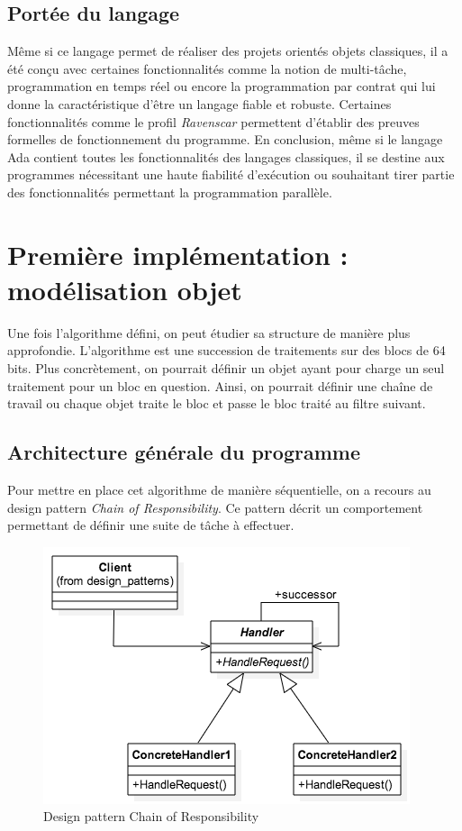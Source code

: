 \documentclass[a4paper]{article}
\begin{document}
\subsection{Portée du langage}
Même si ce langage permet de réaliser des projets orientés objets classiques, il a été conçu avec certaines fonctionnalités comme la notion de multi-tâche, programmation en temps réel ou encore la programmation par contrat qui lui donne la caractéristique d'être un langage fiable et robuste. Certaines fonctionnalités comme le profil \emph{Ravenscar} permettent d'établir des preuves formelles de fonctionnement du programme.
\smallbreak
En conclusion, même si le langage Ada contient toutes les fonctionnalités des langages classiques, il se destine aux programmes nécessitant une haute fiabilité d'exécution ou souhaitant tirer partie des fonctionnalités permettant la programmation parallèle.

\section{Première implémentation : modélisation objet}

Une fois l'algorithme défini, on peut étudier sa structure de manière plus approfondie. L'algorithme est une succession de traitements sur des blocs de 64 bits. Plus concrètement, on pourrait définir un objet ayant pour charge un seul traitement pour un bloc en question. Ainsi, on pourrait définir une chaîne de travail ou chaque objet traite le bloc et passe le bloc traité au filtre suivant. 

\subsection{Architecture générale du programme}
Pour mettre en place cet algorithme de manière séquentielle, on a recours au design pattern \emph{Chain of Responsibility}. Ce pattern décrit un comportement permettant de définir une suite de tâche à effectuer.

\begin{figure}[h]
\begin{center}
\includegraphics[scale=0.5]{images/CoR.png} 
\caption{Design pattern Chain of Responsibility}
\end{center}
\end{figure}
\end{document}

